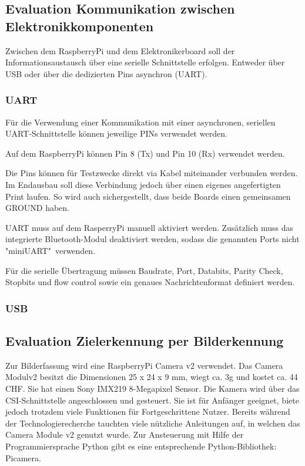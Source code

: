 \documentclass[a4paper]{report}
\begin{document}
\subsection{Evaluation Kommunikation zwischen Elektronikkomponenten}

Zwischen dem RaspberryPi und dem Elektronikerboard soll der Informationsaustausch über eine serielle Schnittstelle erfolgen. Entweder über USB oder über die dedizierten Pins asynchron (UART).

\subsubsection{UART}

Für die Verwendung einer Kommunikation mit einer asynchronen, seriellen UART-Schnittstelle können jeweilige PINs verwendet werden.

Auf dem RaspberryPi können Pin 8 (Tx) und Pin 10 (Rx) verwendet werden.

Die Pins können für Testzwecke direkt via Kabel miteinander verbunden werden. Im Endausbau soll diese Verbindung jedoch über einen eigenes angefertigten Print laufen. So wird auch sichergestellt, dass beide Boards einen gemeinsamen GROUND haben.

UART muss auf dem RasperryPi manuell aktiviert werden.  Zusätzlich muss das integrierte Bluetooth-Modul deaktiviert werden, sodass die genannten Ports nicht "miniUART"\ verwenden.

Für die serielle Übertragung müssen Baudrate, Port, Databits, Parity Check, Stopbits und flow control sowie ein genaues Nachrichtenformat definiert werden.

\subsubsection{USB}


\subsection{Evaluation Zielerkennung per Bilderkennung}

Zur Bilderfassung wird eine RaspberryPi Camera v2 verwendet. Das Camera Modulv2 besitzt die Dimensionen 25 x 24 x 9 mm, wiegt ca. 3g und kostet ca. 44 CHF.
Sie hat einen Sony IMX219 8-Megapixel Sensor. Die Kamera wird über das CSI-Schnittstelle angeschlossen und gesteuert. Sie ist für Anfänger geeignet, biete jedoch trotzdem viele Funktionen für Fortgeschrittene Nutzer.
Bereits während der Technologierecherche tauchten viele nützliche Anleitungen auf, in welchen das Camera Module v2 genutzt wurde.
Zur Ansteuerung mit Hilfe der Programmiersprache Python gibt es eine entsprechende Python-Bibliothek: Picamera.
\end{document}
